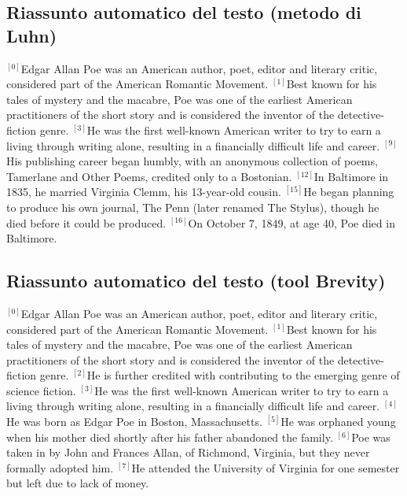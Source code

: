 \subsection*{Riassunto automatico del testo (metodo di Luhn)}
\begin{small}
{$^{[0]}$}Edgar Allan Poe was an American author, poet, editor and literary critic, considered part of the American Romantic Movement.
{$^{[1]}$}Best known for his tales of mystery and the macabre, Poe was one of the earliest American practitioners of the short story and is considered the inventor of the detective-fiction genre.
{$^{[3]}$}He was the first well-known American writer to try to earn a living through writing alone, resulting in a financially difficult life and career.
{$^{[9]}$}His publishing career began humbly, with an anonymous collection of poems, Tamerlane and Other Poems, credited only to a Bostonian.
{$^{[12]}$}In Baltimore in 1835, he married Virginia Clemm, his 13-year-old cousin.
{$^{[15]}$}He began planning to produce his own journal, The Penn (later renamed The Stylus), though he died before it could be produced.
{$^{[16]}$}On October 7, 1849, at age 40, Poe died in Baltimore.
\vfill
\end{small}


\subsection*{Riassunto automatico del testo (tool Brevity)}
\begin{small}
{$^{[0]}$}Edgar Allan Poe was an American author, poet, editor and literary critic, considered part of the American Romantic Movement. 
{$^{[1]}$}Best known for his tales of mystery and the macabre, Poe was one of the earliest American practitioners of the short story and is considered the inventor of the detective-fiction genre. 
{$^{[2]}$}He is further credited with contributing to the emerging genre of science fiction. 
{$^{[3]}$}He was the first well-known American writer to try to earn a living through writing alone, resulting in a financially difficult life and career. 
{$^{[4]}$}He was born as Edgar Poe in Boston, Massachusetts. 
{$^{[5]}$}He was orphaned young when his mother died shortly after his father abandoned the family. 
{$^{[6]}$}Poe was taken in by John and Frances Allan, of Richmond, Virginia, but they never formally adopted him. 
{$^{[7]}$}He attended the University of Virginia for one semester but left due to lack of money.       
\vfill
\end{small}

